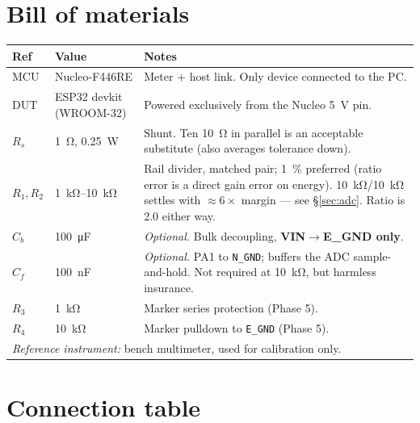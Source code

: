 \documentclass[11pt,a4paper]{article}
\begin{document}
\section{Bill of materials}

\begin{center}
\begin{tabularx}{\textwidth}{llX}
\toprule
\textbf{Ref} & \textbf{Value} & \textbf{Notes} \\
\midrule
MCU     & Nucleo-F446RE            & Meter + host link. Only device connected to the PC. \\
DUT     & ESP32 devkit (WROOM-32)  & Powered exclusively from the Nucleo \SI{5}{\volt} pin. \\
$R_s$   & \SI{1}{\ohm}, \SI{0.25}{\watt} & Shunt. Ten \SI{10}{\ohm} in parallel is an acceptable substitute (also averages tolerance down). \\
$R_1,R_2$ & \SIrange{1}{10}{\kilo\ohm} & Rail divider, matched pair; \SI{1}{\percent} preferred (ratio error is a direct gain error on energy). \SI{10}{\kilo\ohm}/\SI{10}{\kilo\ohm} settles with $\approx6\times$ margin --- see \S\ref{sec:adc}. Ratio is \num{2.0} either way. \\
$C_b$   & \SI{100}{\micro\farad} & \emph{Optional.} Bulk decoupling, \textbf{VIN$\rightarrow$E\_GND only}. \\
$C_f$   & \SI{100}{\nano\farad}  & \emph{Optional.} PA1 to \texttt{N\_GND}; buffers the ADC sample-and-hold. Not required at \SI{10}{\kilo\ohm}, but harmless insurance. \\
$R_3$   & \SI{1}{\kilo\ohm}      & Marker series protection (Phase 5). \\
$R_4$   & \SI{10}{\kilo\ohm}     & Marker pulldown to \texttt{E\_GND} (Phase 5). \\
\midrule
\multicolumn{3}{l}{\textit{Reference instrument:} bench multimeter, used for calibration only.} \\
\bottomrule
\end{tabularx}
\end{center}

\section{Connection table}
\end{document}
